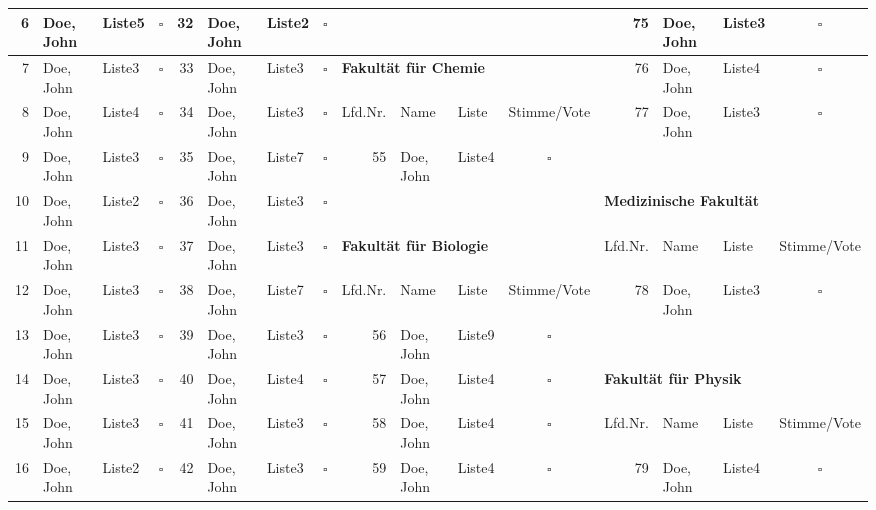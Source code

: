 \documentclass[english,ngerman,10pt]{article}
\begin{document}
{{\begin{tabular}{|r | l | l | c || r | l | l | c || r | l | l | c || r | l | l | c |}
6		& Doe, John				& Liste5		&$\square$		&	32		& Doe, John			& Liste2		&$\square$		&			&						&			&				&75			& Doe, John		& Liste3	&$\square$ \\ \hline

7		& Doe, John				& Liste3		&$\square$		&	33		& Doe, John			& Liste3		&$\square$		&\multicolumn{4}{l||}{\textbf{Fakultät für Chemie}}				&76			& Doe, John		& Liste4	&$\square$ \\ \hline

8		& Doe, John				& Liste4		&$\square$		&	34		& Doe, John			& Liste3		&$\square$		&	Lfd.Nr.	& Name 					& Liste 	& Stimme/Vote 	&77			& Doe, John		&Liste3		&$\square$ \\ \hline

9		& Doe, John				&Liste3			&$\square$		&	35		& Doe, John			& Liste7		&$\square$		&	55		& Doe, John				&Liste4		&$\square$&					&				&			& \\ \hline

10		& Doe, John				& Liste2		&$\square$		&	36		& Doe, John			& Liste3		&$\square$		&			&						&			&	&					\multicolumn{4}{l|}{\textbf{Medizinische Fakultät}} \\ \hline	

11		& Doe, John				& Liste3		&$\square$		&	37		& Doe, John			& Liste3		&$\square$		&\multicolumn{4}{l||}{\textbf{Fakultät für Biologie}}	&			Lfd.Nr.	&Name			&	Liste	&Stimme/Vote \\ \hline

12		& Doe, John				& Liste3		&$\square$		&	38		& Doe, John			& Liste7		&$\square$		& Lfd.Nr.	&Name					& Liste		&Stimme/Vote	&	78		& Doe, John		& Liste3	&$\square$ \\ \hline

13		& Doe, John				& Liste3		&$\square$		& 	39		& Doe, John			& Liste3		&$\square$		&	56		& Doe, John				& Liste9	&$\square$		&			&				&			& \\ \hline	

14		& Doe, John				& Liste3		&$\square$		&	40		& Doe, John			& Liste4		&$\square$		&	57		& Doe, John				& Liste4	&$\square$		&\multicolumn{4}{l|}{\textbf{Fakultät für Physik}} \\ \hline

15		& Doe, John				& Liste3		&$\square$		&	41		& Doe, John			& Liste3		&$\square$		&	58		& Doe, John				& Liste4	&$\square$		&Lfd.Nr.	& Name			& Liste		&Stimme/Vote \\ \hline

16		& Doe, John				& Liste2		&$\square$		&	42		& Doe, John			& Liste3		&$\square$		&	59		& Doe, John				& Liste4	&$\square$		&	79		& Doe, John		& Liste4	&$\square$ \\ \hline

\end{tabular}
\newpage
 }
 }
\end{document}

